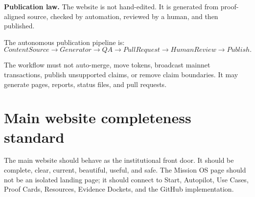 \documentclass[11pt]{article}
\begin{document}
\begin{goldbox}
\textbf{Publication law.} The website is not hand-edited. It is generated from proof-aligned source, checked by automation, reviewed by a human, and then published.
\end{goldbox}

The autonomous publication pipeline is:
\[
ContentSource \rightarrow Generator \rightarrow QA \rightarrow PullRequest \rightarrow HumanReview \rightarrow Publish.
\]

\begin{center}
\end{center}

The workflow must not auto-merge, move tokens, broadcast mainnet transactions, publish unsupported claims, or remove claim boundaries. It may generate pages, reports, status files, and pull requests.

\section{Main website completeness standard}
The main website should behave as the institutional front door. It should be complete, clear, current, beautiful, useful, and safe. The Mission OS page should not be an isolated landing page; it should connect to Start, Autopilot, Use Cases, Proof Cards, Resources, Evidence Dockets, and the GitHub implementation.
\end{document}
